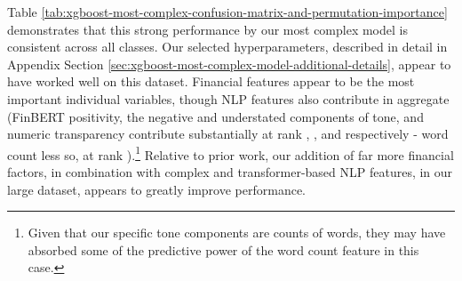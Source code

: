\documentclass{article}[11pt]
\begin{document}
    Table \ref{tab:xgboost-most-complex-confusion-matrix-and-permutation-importance} demonstrates that this strong performance by our most complex model is consistent across all classes. Our selected hyperparameters, described in detail in Appendix Section \ref{sec:xgboost-most-complex-model-additional-details}, appear to have worked well on this dataset. Financial features appear to be the most important individual variables, though NLP features also contribute in aggregate (FinBERT positivity, the negative and understated components of tone, and numeric transparency contribute substantially at rank \rPosScoreFinbert, \rNeg, and \rUndrst \space respectively - word count less so, at rank \rWordCount).\footnote{Given that our specific tone components are counts of words, they may have absorbed some of the predictive power of the word count feature in this case.} Relative to prior work, our addition of far more financial factors, in combination with complex and transformer-based NLP features, in our large dataset, appears to greatly improve performance.
\end{document}
